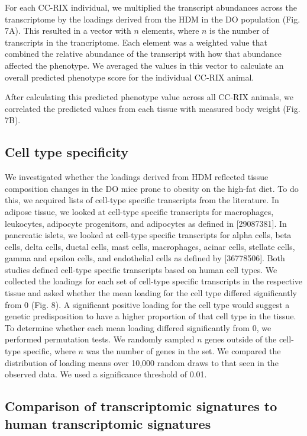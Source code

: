 \documentclass[
]{article}
\begin{document}
For each CC-RIX individual, we multiplied the transcript abundances
across the transcriptome by the loadings derived from the HDM in the DO
population (Fig. 7A). This resulted in a vector with \(n\) elements,
where \(n\) is the number of transcripts in the trancriptome. Each
element was a weighted value that combined the relative abundance of the
transcript with how that abundance affected the phenotype. We averaged
the values in this vector to calculate an overall predicted phenotype
score for the individual CC-RIX animal.

After calculating this predicted phenotype value across all CC-RIX
animals, we correlated the predicted values from each tissue with
measured body weight (Fig. 7B).

\subsection{Cell type specificity}\label{cell-type-specificity}

We investigated whether the loadings derived from HDM reflected tissue
composition changes in the DO mice prone to obesity on the high-fat
diet. To do this, we acquired lists of cell-type specific transcripts
from the literature. In adipose tissue, we looked at cell-type specific
transcripts for macrophages, leukocytes, adipocyte progenitors, and
adipocytes as defined in {[}29087381{]}. In pancreatic islets, we looked
at cell-type specific transcripts for alpha cells, beta cells, delta
cells, ductal cells, mast cells, macrophages, acinar cells, stellate
cells, gamma and epsilon cells, and endothelial cells as defined by
{[}36778506{]}. Both studies defined cell-type specific transcripts
based on human cell types. We collected the loadings for each set of
cell-type specific transcripts in the respective tissue and asked
whether the mean loading for the cell type differed significantly from 0
(Fig. 8). A significant positive loading for the cell type would suggest
a genetic predisposition to have a higher proportion of that cell type
in the tissue. To determine whether each mean loading differed
significantly from 0, we performed permutation tests. We randomly
sampled \(n\) genes outside of the cell-type specific, where \(n\) was
the number of genes in the set. We compared the distribution of loading
means over 10,000 random draws to that seen in the observed data. We
used a significance threshold of 0.01.

\subsection{Comparison of transcriptomic signatures to human
transcriptomic
signatures}\label{comparison-of-transcriptomic-signatures-to-human-transcriptomic-signatures}
\end{document}
